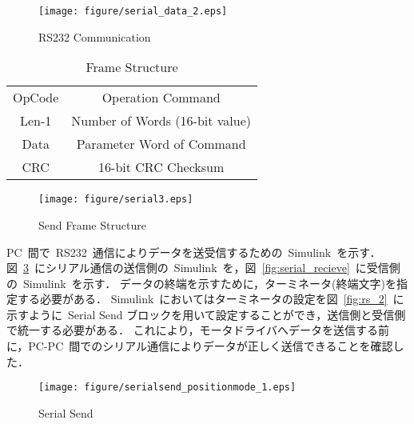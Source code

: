 \documentclass[a4paper,12pt]{article_vdlab_sotsuron}
\begin{document}
\vspace{5mm}
\begin{figure}[h]
  \begin{center}
    \texttt{[image: figure/serial\_data\_2.eps]}
    \vspace{3mm}
    \caption{RS232 Communication}
    \label{fig:serial2}
  \end{center}
\end{figure}

\vspace{5mm}
\begin{table}[h]
  \begin{center}
    \caption{Frame Structure}
    \label{tab:serial}
    \begin{tabular}{cc}\hline
      OpCode & Operation Command \\
      Len-1 & Number of Words (16-bit value) \\
      Data & Parameter Word of Command \\
      CRC & 16-bit CRC Checksum \\\hline
    \end{tabular}
  \end{center}
\end{table}

\vspace{5mm}
\begin{figure}[h]
  \begin{center}
    \texttt{[image: figure/serial3.eps]}
    \vspace{3mm}
    \caption{Send Frame Structure}
    \label{fig:serial3}
  \end{center}
\end{figure}


\newpage
PC~間で~RS232~通信によりデータを送受信するための~Simulink~を示す．
図~\ref{fig:serial_send}~にシリアル通信の送信側の~Simulink~を，図~\ref{fig:serial_recieve}~に受信側の~Simulink~を示す．
データの終端を示すために，ターミネータ(終端文字)を指定する必要がある．
Simulink~においてはターミネータの設定を図~\ref{fig:rs_2}~に示すように~Serial Send ブロックを用いて設定することができ，送信側と受信側で統一する必要がある．
これにより，モータドライバへデータを送信する前に，PC-PC~間でのシリアル通信によりデータが正しく送信できることを確認した．

\vspace{10mm}
\begin{figure}[h]
  \begin{center}
    \texttt{[image: figure/serialsend\_positionmode\_1.eps]}
    \vspace{3mm}
    \caption{Serial Send}
    \label{fig:serial_send}
  \end{center}
\end{figure}
\end{document}
